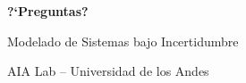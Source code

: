 \documentclass[aspectratio=1610, 9pt]{beamer}
\begin{document}
\begin{frame}{}
\vfill
\centering
{\Huge\bfseries\color{uniblue} ?`Preguntas?}

\vspace{12pt}
{\large Modelado de Sistemas bajo Incertidumbre}

\vspace{6pt}
{\small AIA Lab -- Universidad de los Andes}
\vfill
\end{frame}
\end{document}
